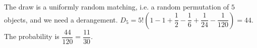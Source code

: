 The draw is a uniformly random matching, i.e. a random permutation of $5$ objects, and we need a derangement. $D_5=5!\left(1-1+\dfrac12-\dfrac16+\dfrac1{24}-\dfrac1{120}\right)=44$. The probability is $\dfrac{44}{120}=\boxed{\dfrac{11}{30}}$.
